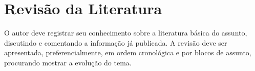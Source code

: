 
\chapter{Revis\~ao da Literatura}\label{cap:revisaodaliteratura}

O autor deve registrar seu conhecimento sobre a literatura b\'asica do assunto, discutindo e comentando a informa\c{c}\~ao j\'a publicada. A revis\~ao deve ser apresentada, preferencialmente, em ordem cronol\'ogica e por blocos de assunto, procurando mostrar a evolu\c{c}\~ao do tema.
